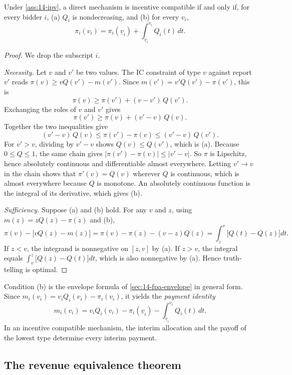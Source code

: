 \begin{lemma}\label{lem:14-ic}
Under \cref{ass:14-ipv}, a direct mechanism is incentive compatible if and only if, for every bidder $i$, (a) $Q_i$ is nondecreasing, and (b) for every $v_i$,
\begin{equation}\label{eq:14-envelope-ic}
\pi_i(v_i)=\pi_i(\underline v_i)+\int_{\underline v_i}^{v_i}Q_i(t)\,dt.
\end{equation}
\end{lemma}

\begin{proof}
We drop the subscript $i$.

\emph{Necessity.} Let $v$ and $v'$ be two values. The IC constraint of type $v$ against report $v'$ reads $\pi(v)\ge vQ(v')-m(v')$. Since $m(v')=v'Q(v')-\pi(v')$, this is
\[
\pi(v)\ge\pi(v')+(v-v')\,Q(v').
\]
Exchanging the roles of $v$ and $v'$ gives
\[
\pi(v')\ge\pi(v)+(v'-v)\,Q(v).
\]
Together the two inequalities give
\[
(v'-v)\,Q(v)\le\pi(v')-\pi(v)\le(v'-v)\,Q(v').
\]
For $v'>v$, dividing by $v'-v$ shows $Q(v)\le Q(v')$, which is (a). Because $0\le Q\le 1$, the same chain gives $|\pi(v')-\pi(v)|\le|v'-v|$. So $\pi$ is Lipschitz, hence absolutely continuous and differentiable almost everywhere. Letting $v'\to v$ in the chain shows that $\pi'(v)=Q(v)$ wherever $Q$ is continuous, which is almost everywhere because $Q$ is monotone. An absolutely continuous function is the integral of its derivative, which gives (b).

\emph{Sufficiency.} Suppose (a) and (b) hold. For any $v$ and $z$, using $m(z)=zQ(z)-\pi(z)$ and (b),
\[
\pi(v)-\big[vQ(z)-m(z)\big]=\pi(v)-\pi(z)-(v-z)Q(z)=\int_z^v\big[Q(t)-Q(z)\big]dt.
\]
If $z<v$, the integrand is nonnegative on $[z,v]$ by (a). If $z>v$, the integral equals $\int_v^z\big[Q(z)-Q(t)\big]dt$, which is also nonnegative by (a). Hence truth-telling is optimal.
\end{proof}

Condition (b) is the envelope formula of \cref{sec:14-fpa-envelope} in general form. Since $m_i(v_i)=v_iQ_i(v_i)-\pi_i(v_i)$, it yields the \emph{payment identity}
\begin{equation}\label{eq:14-payment-identity}
m_i(v_i)=v_iQ_i(v_i)-\pi_i(\underline v_i)-\int_{\underline v_i}^{v_i}Q_i(t)\,dt.
\end{equation}
In an incentive compatible mechanism, the interim allocation and the payoff of the lowest type determine every interim payment.

\subsection{The revenue equivalence theorem}\label{sec:14-ret-theorem}

